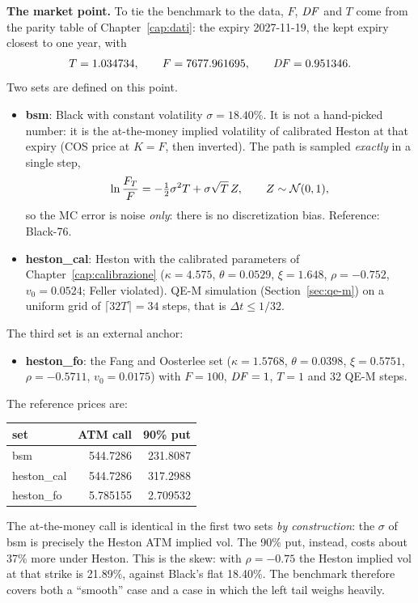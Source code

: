 \textbf{The market point.} To tie the benchmark to the data, $F$, $\mathit{DF}$ and $T$ come from the parity table of Chapter~\ref{cap:dati}: the expiry \mbox{2027-11-19}, the kept expiry closest to one year, with
\[
T=1.034734,\qquad F=7677.961695,\qquad \mathit{DF}=0.951346 .
\]
Two sets are defined on this point.
\begin{itemize}
\item \textbf{bsm}: Black with constant volatility $\sigma=18.40\%$. It is not a hand-picked number: it is the
at-the-money implied volatility of calibrated Heston at that expiry (COS price at $K=F$, then inverted). The path is
sampled \emph{exactly} in a single step,
\[
\ln\frac{F_T}F=-\tfrac12\sigma^2T+\sigma\sqrt T\,Z,\qquad Z\sim\mathcal{N}(0,1),
\]
so the MC error is noise \emph{only}: there is no discretization bias. Reference: Black-76.
\item \textbf{heston\_cal}: Heston with the calibrated parameters of Chapter~\ref{cap:calibrazione}
($\kappa=4.575$, $\theta=0.0529$, $\xi=1.648$, $\rho=-0.752$, $v_0=0.0524$; Feller violated). QE-M simulation
(Section~\ref{sec:qe-m}) on a uniform grid of $\lceil32T\rceil=34$ steps, that is $\Delta t\le1/32$.
\end{itemize}
The third set is an external anchor:
\begin{itemize}
\item \textbf{heston\_fo}: the Fang and Oosterlee set ($\kappa=1.5768$, $\theta=0.0398$, $\xi=0.5751$,
$\rho=-0.5711$, $v_0=0.0175$) with $F=100$, $\mathit{DF}=1$, $T=1$ and 32 QE-M steps.
\end{itemize}

\begin{esempio}[title={Example: same ATM vol, very different puts}]
The reference prices are:
\begin{center}
\small
\begin{tabular}{lrr}
\toprule
set & ATM call & 90\% put\\
\midrule
bsm & 544.7286 & 231.8087\\
heston\_cal & 544.7286 & 317.2988\\
heston\_fo & 5.785155 & 2.709532\\
\bottomrule
\end{tabular}
\end{center}
The at-the-money call is identical in the first two sets \emph{by construction}: the $\sigma$ of bsm is precisely the
Heston ATM implied vol. The 90\% put, instead, costs about 37\% more under Heston. This is the skew: with
$\rho=-0.75$ the Heston implied vol at that strike is 21.89\%, against Black's flat 18.40\%. The benchmark therefore
covers both a ``smooth'' case and a case in which the left tail weighs heavily.
\end{esempio}

